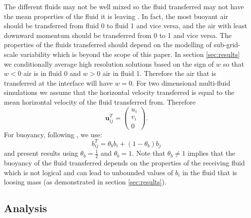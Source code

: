 \documentclass[draft]{agujournal2019}
\begin{document}
The different fluids may not be well mixed so the fluid transferred
may not have the mean properties of the fluid it is leaving \cite<as was assumed by>{WM19}.
In fact, the most buoyant air should be transferred from fluid 0 to
fluid 1 and vice versa, and the air with least downward momentum should
be transferred from 0 to 1 and vice versa. The properties of the fluids
transferred should depend on the modelling of sub-grid-scale variability
which is beyond the scope of this paper. In section \ref{sec:results}
we conditionally average high resolution solutions based on the sign
of $w$ so that $w<0$ air is in fluid 0 and $w>0$ air in fluid 1.
Therefore the air that is transferred at the interface will have $w=0$.
For two dimensional multi-fluid simulations we assume that the horizontal
velocity transferred is equal to the mean horizontal velocity of the
fluid transferred from. Therefore
\begin{equation}
\mathbf{u}_{ij}^{T}=\begin{pmatrix}u_{i}\\
v_{i}\\
0
\end{pmatrix}.
\end{equation}
For buoyancy, following , we use:
\begin{equation}
b_{ij}^{T}=\theta_{b}b_{i}+(1-\theta_{b})b_{j}
\end{equation}
and present results using $\theta_{b}=\frac{1}{2}$ and $\theta_{b}=1$.
Note that $\theta_{b}\ne1$ implies that the buoyancy of the fluid
transferred depends on the properties of the receiving fluid which
is not logical and can lead to unbounded values of $b_{i}$ in the
fluid that is loosing mass (as demonstrated in section \ref{sec:results}).

\subsection{ Analysis\label{subsec:dimAnal}}
\end{document}
